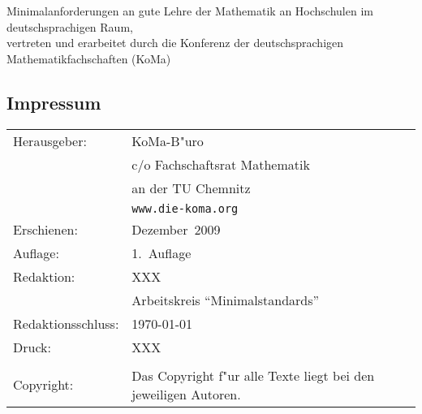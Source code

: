\newpage
\vspace*{5cm}

\begin{center}
	Minimalanforderungen an gute Lehre der Mathematik
	an Hochschulen im deutschsprachigen Raum,\\
	vertreten und erarbeitet durch die Konferenz der deutschsprachigen Mathematikfachschaften (KoMa)
\end{center}

\vfill
\subsection*{Impressum}

\begin{table}[h]
\footnotesize
		\begin{tabular}{ll}
		Herausgeber:				& KoMa-B"uro \\
									& c/o Fachschaftsrat Mathematik \\
									& an der TU Chemnitz \\
									& \texttt{www.die-koma.org} \\
		Erschienen:					& Dezember~2009 \\
		Auflage:					& 1.~Auflage\\
		Redaktion:					& XXX \\
									& Arbeitskreis "`Minimalstandards"'\\ 
		Redaktionsschluss:			& \today \\
		Druck:						& XXX \\
												& \\
		Copyright:					& Das Copyright f"ur alle Texte liegt bei den jeweiligen Autoren. \\
		\end{tabular}
\end{table}